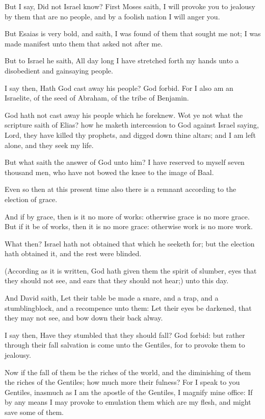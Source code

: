 \Verse But I say, Did not Israel know? First Moses saith, I will provoke you to jealousy by them that are no people, and by a foolish nation I will anger you.

\Verse But Esaias is very bold, and saith, I was found of them that sought me not; I was made manifest unto them that asked not after me.

\Verse But to Israel he saith, All day long I have stretched forth my hands unto a disobedient and gainsaying people.


\Chapter
\Verse I say then, Hath God cast away his people? God forbid. For I also am an Israelite, of the seed of Abraham, of the tribe of Benjamin.

\Verse God hath not cast away his people which he foreknew. Wot ye not what the scripture saith of Elias? how he maketh intercession to God against Israel saying, \Verse Lord, they have killed thy prophets, and digged down thine altars; and I am left alone, and they seek my life.

\Verse But what saith the answer of God unto him? I have reserved to myself seven thousand men, who have not bowed the knee to the image of Baal.

\Verse Even so then at this present time also there is a remnant according to the election of grace.

\Verse And if by grace, then is it no more of works: otherwise grace is no more grace. But if it be of works, then it is no more grace: otherwise work is no more work.

\Verse What then? Israel hath not obtained that which he seeketh for; but the election hath obtained it, and the rest were blinded.

\Verse (According as it is written, God hath given them the spirit of slumber, eyes that they should not see, and ears that they should not hear;) unto this day.

\Verse And David saith, Let their table be made a snare, and a trap, and a stumblingblock, and a recompence unto them: \Verse Let their eyes be darkened, that they may not see, and bow down their back alway.

\Verse I say then, Have they stumbled that they should fall? God forbid: but rather through their fall salvation is come unto the Gentiles, for to provoke them to jealousy.

\Verse Now if the fall of them be the riches of the world, and the diminishing of them the riches of the Gentiles; how much more their fulness?  \Verse For I speak to you Gentiles, inasmuch as I am the apostle of the Gentiles, I magnify mine office: \Verse If by any means I may provoke to emulation them which are my flesh, and might save some of them.

